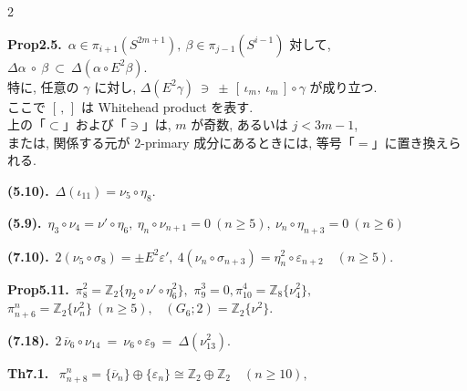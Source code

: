 \documentclass[10pt, leqno]{ltjsarticle}
\newcommand{\ov}[1]{\overline{#1}}
\newcommand{\gen}[1]{\{#1\}}       %
\newcommand{\pit}[2]{\pi_{#1}^{#2}}
\numberwithin{equation}{section}
\theoremstyle{plain}
\theoremstyle{definition}
\theoremstyle{remark}
\begin{document}
\begin{paracol}{2}
\switchcolumn

\noindent
\textbf{Prop2.5.}\
$\alpha\in\pi_{i+1}(S^{2m+1}), \ \beta\in \pi_{j-1}(S^{i-1})$ 対して, 
\(
\Delta\alpha\ \circ\ \beta\ \subset\ \Delta(\alpha\circ E^2\beta).
\)\\
特に, 任意の $\gamma$ に対し,
\(
\Delta(E^2\gamma)\ \ni\ \pm\,[\,\iota_m,\ \iota_m\,]\circ\gamma
\)
が成り立つ. \\
ここで $[\, ,\,]$ は Whitehead product を表す. \\
上の「$\subset$」および「$\ni$」は, $m$ が奇数, 
あるいは $j<3m-1$, \\
または, 関係する元が \(2\)-primary 成分にあるときには, 
等号「$=$」に置き換えられる. 

\noindent
\textbf{(5.10).}\
\(\Delta(\iota_{11})=\nu_5\circ\eta_8 .\)

\noindent
\textbf{(5.9).}\
\(\eta_3\circ \nu_4= \nu'\circ \eta_6,\
\eta_n\circ \nu_{n+1}=0\ (n\ge5),\
\nu_n\circ \eta_{n+3}=0\ (n\ge6)\)

\noindent
\textbf{(7.10).}\
\(2(\nu_{5}\circ\sigma_{8})=\pm E^{2}\varepsilon',\
4(\nu_{n}\circ\sigma_{n+3})=\eta_{n}^{2}\circ\varepsilon_{n+2}\quad(n\ge5).\)

\noindent
\textbf{Prop5.11.}\
\(\pi^{2}_{8}=\mathbb Z_2\gen{\eta_{2}\circ\nu'\circ\eta_6^2},\)\quad 
\(\pi^{3}_{9}=0,\)\quad \(\pi^{4}_{10}=\mathbb Z_8\gen{\nu_{4}^2},\) \\
\(\pi^{n}_{n+6}=\mathbb Z_2\gen{\nu_n^2}\ (n\ge5),\) \
\((G_{6};2)=\mathbb Z_2\gen{\nu^2}.\)

\noindent
\textbf{(7.18).}\
\(2\,\overline{\nu}_{6}\circ \nu_{14}
\ =\ \nu_{6}\circ\varepsilon_{9}
\ =\ \Delta(\nu_{13}^{2}).\)

\noindent
\textbf{Th7.1.}\
\(\pit{n+8}{n}=\gen{\ov{\nu}_{n}}\oplus\gen{\varepsilon_{n}}\cong \mathbb Z_{2}\oplus\mathbb Z_{2}\quad (n\ge10),\)


\end{paracol}
\end{document}
